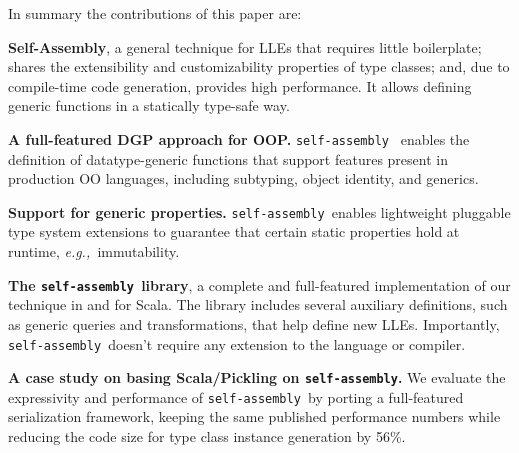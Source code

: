 \documentclass[preprint,nocopyrightspace]{sigplanconf}
\newcommand{\eg}{{\em e.g.,~}}
\newcommand{\selfassembly}{\texttt{self-assembly~}}
\newcommand{\sselfassembly}{\texttt{self-assembly}}
\begin{document}
In summary the contributions of this paper are:

\begin{itemize*}

\item {\bf Self-Assembly}, a general technique for LLEs that requires
  little boilerplate; shares the extensibility and customizability
  properties of type classes; and, due to compile-time
  code generation, provides high performance. It allows defining
  generic functions in a statically type-safe way.

\item {\bf A full-featured DGP approach for OOP.} \selfassembly
  enables the definition of datatype-generic functions that
  support features present in production OO languages, including
  subtyping, object identity, and generics.

\item {\bf Support for generic
  properties.} \selfassembly enables lightweight pluggable type system extensions
  to guarantee that certain static properties hold at
  runtime, \eg immutability.

\item {\bf The \selfassembly library}, a complete and full-featured
  implementation of our technique in and for Scala.
  The library includes several auxiliary definitions, such as
  generic queries and transformations, that help define new LLEs.
  Importantly, \selfassembly doesn't require any extension to the
  language or compiler.

\item {\bf A case study on basing Scala/Pickling on \sselfassembly.}
  We evaluate the expressivity and performance of \selfassembly by
  porting a full-featured serialization framework, keeping the same
  published performance numbers while reducing the code size for
  type class instance generation by 56\%.




\end{itemize*}
\end{document}

